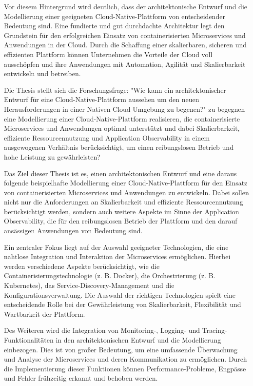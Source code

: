 Vor diesem Hintergrund wird deutlich, dass der architektonische Entwurf und die Modellierung einer geeigneten Cloud-Native-Plattform von entscheidender Bedeutung sind. Eine fundierte und gut durchdachte Architektur legt den Grundstein für den erfolgreichen Einsatz von containerisierten Microservices und Anwendungen in der Cloud. Durch die Schaffung einer skalierbaren, sicheren und effizienten Plattform können Unternehmen die Vorteile der Cloud voll ausschöpfen und ihre Anwendungen mit Automation, Agilität und Skalierbarkeit entwickeln und betreiben.

Die Thesis stellt sich die Forschungsfrage: "Wie kann ein architektonischer Entwurf für eine Cloud-Native-Plattform aussehen um den neuen Herausforderungen in einer Nativen Cloud Umgebung zu begenen?" zu begegnen eine Modellierung einer Cloud-Native-Plattform realisieren, die containerisierte Microservices und Anwendungen optimal unterstützt und dabei Skalierbarkeit, effiziente Ressourcennutzung und Application Observability in einem ausgewogenen Verhältnis berücksichtigt, um einen reibungslosen Betrieb und hohe Leistung zu gewährleisten?

Das Ziel dieser Thesis ist es, einen architektonischen Entwurf und eine daraus folgende beispielhafte Modellierung einer Cloud-Native-Plattform für den Einsatz von containerisierten Microservices und Anwendungen zu entwickeln. Dabei sollen nicht nur die Anforderungen an Skalierbarkeit und effiziente Ressourcennutzung berücksichtigt werden, sondern auch weitere Aspekte im Sinne der Application Observability, die für den reibungslosen Betrieb der Plattform und den darauf ansässigen Anwendungen von Bedeutung sind.

Ein zentraler Fokus liegt auf der Auswahl geeigneter Technologien, die eine nahtlose Integration und Interaktion der Microservices ermöglichen. Hierbei werden verschiedene Aspekte berücksichtigt, wie die Containerisierungstechnologie (z. B. Docker), die Orchestrierung (z. B. Kubernetes), das Service-Discovery-Management und die Konfigurationsverwaltung. Die Auswahl der richtigen Technologien spielt eine entscheidende Rolle bei der Gewährleistung von Skalierbarkeit, Flexibilität und Wartbarkeit der Plattform.

Des Weiteren wird die Integration von Monitoring-, Logging- und Tracing-Funktionalitäten in den architektonischen Entwurf und die Modellierung einbezogen. Dies ist von großer Bedeutung, um eine umfassende Überwachung und Analyse der Microservices und deren Kommunikation zu ermöglichen. Durch die Implementierung dieser Funktionen können Performance-Probleme, Engpässe und Fehler frühzeitig erkannt und behoben werden.

